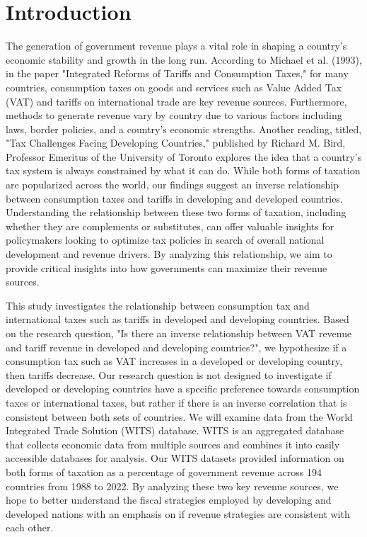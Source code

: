 \documentclass[12pt]{article}
\begin{document}
\section{Introduction} \label{sec:introduction}
The generation of government revenue plays a vital role in shaping a country's economic stability and growth in the long run. According to Michael et al. (1993), in the paper "Integrated Reforms of Tariffs and Consumption Taxes," for many countries, consumption taxes on goods and services such as Value Added Tax (VAT) and tariffs on international trade are key revenue sources. Furthermore, methods to generate revenue vary by country due to various factors including laws, border policies, and a country's economic strengths. Another reading, titled, "Tax Challenges Facing Developing Countries," published by Richard M. Bird, Professor Emeritus of the University of Toronto explores the idea that a country's tax system is always constrained by what it can do. While both forms of taxation are popularized across the world, our findings suggest an inverse relationship between consumption taxes and tariffs in developing and developed countries. Understanding the relationship between these two forms of taxation, including whether they are complements or substitutes, can offer valuable insights for policymakers looking to optimize tax policies in search of overall national development and revenue drivers. By analyzing this relationship, we aim to provide critical insights into how governments can maximize their revenue sources. 

This study investigates the relationship between consumption tax and international taxes such as tariffs in developed and developing countries. Based on the research question, "Is there an inverse relationship between VAT revenue and tariff revenue in developed and developing countries?", we hypothesize if a consumption tax such as VAT increases in a developed or developing country, then tariffs decrease. Our research question is not designed to investigate if developed or developing countries have a specific preference towards consumption taxes or international taxes, but rather if there is an inverse correlation that is consistent between both sets of countries. We will examine data from the World Integrated Trade Solution (WITS) database. WITS is an aggregated database that collects economic data from multiple sources and combines it into easily accessible databases for analysis. Our WITS datasets provided information on both forms of taxation as a percentage of government revenue across 194 countries from 1988 to 2022. By analyzing these two key revenue sources, we hope to better understand the fiscal strategies employed by developing and developed nations with an emphasis on if revenue strategies are consistent with each other. 
\end{document}
